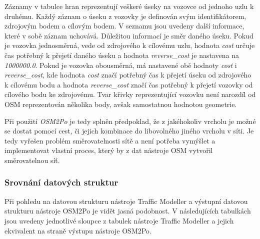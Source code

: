 Záznamy v tabulce hran reprezentují veškeré úseky na vozovce od jednoho uzlu k druhému. Každý záznam o úseku z vozovky je definován svým identifikátorem, zdrojovým bodem a cílovým bodem. V seznamu jsou uvedeny další informace, které v sobě záznam uchovává. Důležitou informací je směr daného úseku. Pokud je vozovka jednosměrná, vede od zdrojového k cílovému uzlu, hodnota \textit{cost} určuje čas potřebný k přejetí daného úseku a hodnota \textit{reverse\_cost} je nastavena na \textit{1000000.0}. Pokud je vozovka obousměrná, má nastavené obě hodnoty \textit{cost} i \textit{reverse\_cost}, kde hodnota \textit{cost} značí potřebný čas k přejetí úseku od zdrojového k cílovému bodu a hodnota \textit{reverse\_cost} značí čas potřebný k přejetí vozovky od cílového bodu ke zdrojovému. Tvar křivky reprezentující vozovku není narozdíl od OSM reprezentován několika body, avšak samostatnou hodnotou geometrie. 

Při použití \textit{OSM2Po} je tedy splněn předpoklad, že z jakéhokoliv vrcholu je možné se dostat pomocí cest, či jejich kombinace do libovolného jiného vrcholu v síti. Je tedy vyřešen problém směrovatelnosti sítě a není potřeba vymýšlet a implementovat vlastní proces, který by z dat nástroje OSM vytvořil směrovatelnou síť. 

\subsubsection{Srovnání datových struktur}

Při pohledu na datovou strukturu nástroje Traffic Modeller a výstupní datovou strukturu nástroje OSM2Po je vidět jasná podobnost. V následujících tabulkách jsou uvedeny jednotlivé sloupce z tabulek nástroje Traffic Modeller a jejich ekvivalent na straně výstupu nástroje OSM2Po.

